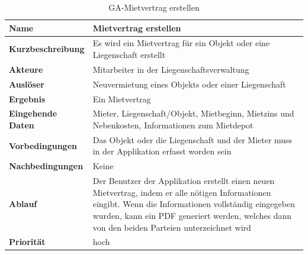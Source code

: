 \begin{table}[H]
  \centering
  \settowidth{}
  \setlength\extrarowheight{2pt}
  \begin{tabulary}{1.0\textwidth}{|a|m{12cm}|}
    \hline
    \textbf{Name}& Mietvertrag erstellen\\
    \hline 
    \textbf{Kurzbeschreibung} & Es wird ein Mietvertrag für ein Objekt oder eine Liegenschaft erstellt\\
    \hline
    \textbf{Akteure} & Mitarbeiter in der Liegenschaftsverwaltung\\
    \hline
    \textbf{Auslöser} & Neuvermietung eines Objekts oder einer Liegenschaft\\
    \hline
    \textbf{Ergebnis} & Ein Mietvertrag\\
    \hline
    \textbf{Eingehende Daten} & Mieter, Liegenschaft/Objekt, Mietbeginn, Mietzins und Nebenkosten, Informationen zum Mietdepot\\
    \hline
    \textbf{Vorbedingungen} & Das Objekt oder die Liegenschaft und der Mieter muss in der Applikation erfasst worden sein\\
    \hline
    \textbf{Nachbedingungen} & Keine\\
    \hline
    \textbf{Ablauf} & Der Benutzer der Applikation erstellt einen neuen Mietvertrag, indem er alle nötigen Informationen eingibt. Wenn die Informationen vollständig eingegeben wurden, kann ein PDF generiert werden, welches dann von den beiden Parteien unterzeichnet wird \\
    \hline
    \textbf{Priorität} & hoch\\
    \hline
  \end{tabulary}
  \caption{GA-Mietvertrag erstellen}
\end{table}

